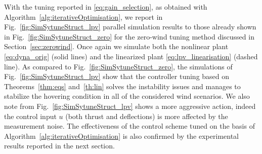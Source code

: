 With the tuning reported in \eqref{eq:gain_selection}, as obtained with Algorithm~\ref{alg:iterativeOptimisation}, we report in  Fig.~\ref{fig:SimSytuneStruct_lpv} parallel simulation results to those already shown in Fig.~\ref{fig:SimSytuneStruct_zero} for the zero-wind tuning method discussed in Section~\ref{sec:zerowind}. Once again we simulate both the nonlinear plant \eqref{eq:dyna_orig} (solid lines) and the linearized plant \eqref{eq:lpv_linearisation} (dashed line). 
As compared to Fig.~\ref{fig:SimSytuneStruct_zero}, the simulations of Fig.~\ref{fig:SimSytuneStruct_lpv} show that the controller tuning based on Theorems~\ref{thm:eqs} and~\ref{th:lin} 
solves the instability issues and manages to stabilize the hovering condition in all of the considered wind scenarios. We also note from 
Fig.~\ref{fig:SimSytuneStruct_lpv} shows a more aggressive action, indeed the control input $u$ (both thrust and deflections) is more affected by the measurement noise.
The effectiveness of the control scheme tuned on the basis of Algorithm~\ref{alg:iterativeOptimisation} is also confirmed by the experimental results reported in the next section.



